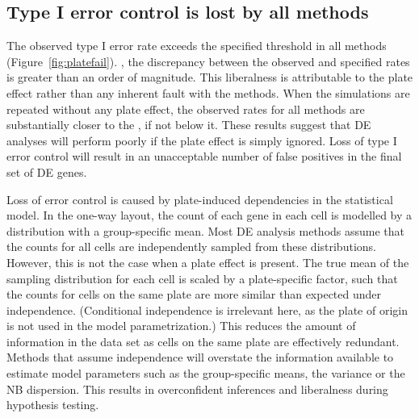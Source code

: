 \documentclass[oupdraft]{bio}
\begin{document}

\subsection{Type I error control is lost by all methods}
The observed type I error rate exceeds the specified threshold in all methods (Figure~\ref{fig:platefail}).
, the discrepancy between the observed and specified rates is greater than an order of magnitude.
This liberalness is attributable to the plate effect rather than any inherent fault with the methods.
When the simulations are repeated without any plate effect, the observed rates for all methods are substantially closer to the , if not below it.
These results suggest that DE analyses will perform poorly if the plate effect is simply ignored.
Loss of type I error control will result in an unacceptable number of false positives in the final set of DE genes.

Loss of error control is caused by plate-induced dependencies in the statistical model.
In the one-way layout, the count of each gene in each cell is modelled by a distribution with a group-specific mean.
Most DE analysis methods assume that the counts for all cells are independently sampled from these distributions.
However, this is not the case when a plate effect is present.
The true mean of the sampling distribution for each cell is scaled by a plate-specific factor, 
    such that the counts for cells on the same plate are more similar than expected under independence.
(Conditional independence is irrelevant here, as the plate of origin is not used in the model parametrization.)
This reduces the amount of information in the data set as cells on the same plate are effectively redundant.
Methods that assume independence will overstate the information available to estimate model parameters such as the group-specific means, the variance or the NB dispersion.
This results in overconfident inferences and liberalness during hypothesis testing.
\end{document}
